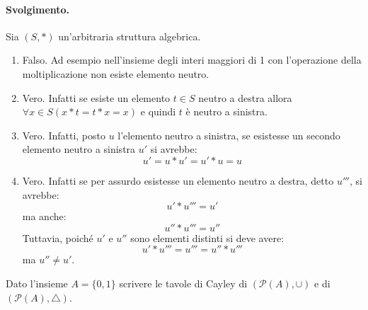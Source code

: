 \paragraph*{Svolgimento.} Sia $(S,\ast)$ un'arbitraria struttura algebrica.
\begin{enumerate}
	\item Falso. Ad esempio nell'insieme degli interi maggiori di 1 con l'operazione della moltiplicazione non esiste elemento neutro.
	\item Vero. Infatti se esiste un elemento $t \in S$ neutro a destra allora $\forall x \in S (x \ast t = t \ast x = x )$ e quindi $t$ è neutro a sinistra.
	\item Vero. Infatti, posto $u$ l'elemento neutro a sinistra, se esistesse un secondo elemento neutro a sinistra $u'$ si avrebbe:
	\begin{displaymath}
		u' = u \ast u' = u' \ast u = u
	\end{displaymath}
	\item Vero. Infatti se per assurdo esistesse un elemento neutro a destra, detto $u'''$, si avrebbe:
	\begin{displaymath}
		u'  \ast u''' = u'
	\end{displaymath}
	ma anche:
	\begin{displaymath}
		u'' \ast u''' = u''
	\end{displaymath}
	Tuttavia, poiché $u'$ e $u''$ sono elementi distinti si deve avere:
	\begin{displaymath}
		u' \ast u''' = u''' = u'' \ast u'''
	\end{displaymath}
	ma $u'' \neq u'$. \hfill \blacksquare
\end{enumerate}
\begin{exsbox}
	Dato l'insieme $A=\{0,1\}$ scrivere le tavole di Cayley di $(\mathcal{P}(A), \cup)$ e di $(\mathcal{P}(A), \triangle)$.
\end{exsbox}

